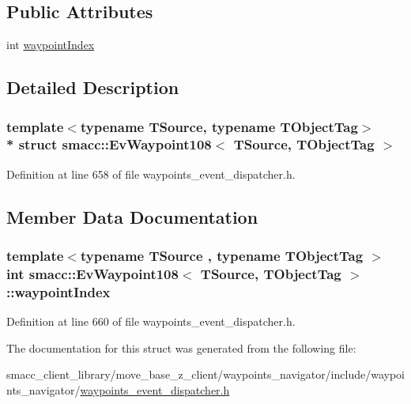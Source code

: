 \subsection*{Public Attributes}
\begin{DoxyCompactItemize}
\item 
int \hyperlink{structsmacc_1_1EvWaypoint108_a9021cb55c7849608fefe749b4315934f}{waypoint\+Index}
\end{DoxyCompactItemize}


\subsection{Detailed Description}
\subsubsection*{template$<$typename T\+Source, typename T\+Object\+Tag$>$\\*
struct smacc\+::\+Ev\+Waypoint108$<$ T\+Source, T\+Object\+Tag $>$}



Definition at line 658 of file waypoints\+\_\+event\+\_\+dispatcher.\+h.



\subsection{Member Data Documentation}
\subsubsection[{\texorpdfstring{waypoint\+Index}{waypointIndex}}]{\setlength{\rightskip}{0pt plus 5cm}template$<$typename T\+Source , typename T\+Object\+Tag $>$ int {\bf smacc\+::\+Ev\+Waypoint108}$<$ T\+Source, T\+Object\+Tag $>$\+::waypoint\+Index}\hypertarget{structsmacc_1_1EvWaypoint108_a9021cb55c7849608fefe749b4315934f}{}\label{structsmacc_1_1EvWaypoint108_a9021cb55c7849608fefe749b4315934f}


Definition at line 660 of file waypoints\+\_\+event\+\_\+dispatcher.\+h.



The documentation for this struct was generated from the following file\+:\begin{DoxyCompactItemize}
\item 
smacc\+\_\+client\+\_\+library/move\+\_\+base\+\_\+z\+\_\+client/waypoints\+\_\+navigator/include/waypoints\+\_\+navigator/\hyperlink{waypoints__event__dispatcher_8h}{waypoints\+\_\+event\+\_\+dispatcher.\+h}\end{DoxyCompactItemize}
